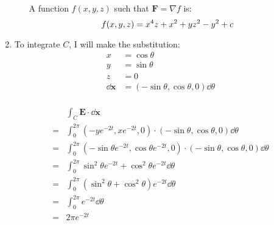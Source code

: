 \documentclass[10pt,\jkfside,a4paper]{article}
\begin{document}
\begin{enumerate}
\begin{enumerate}[label=(\roman*)]
A function $f(x, y, z)$ such that $\mathbf{F} = \nabla f$ is:
\begin{equation}
f(x, y, z) = x^4z + x^2 + yz^2 - y^2 + c \\
\end{equation}

\end{enumerate}

\item 

To integrate $C$, I will make the substitution:
\begin{equation}
\begin{split}
x &= \cos\theta \\
y &= \sin\theta \\
z &= 0 \\
\dd{\mathbf{x}} &= (-\sin\theta, \cos\theta, 0) \dd{\theta} \\
\end{split}
\end{equation}

\begin{equation}
\begin{split}
 & \int_C \mathbf{E} \cdot \dd{\mathbf{x}} \\
=& \int^{2\pi}_0 (-ye^{-2t}, xe^{-2t}, 0) \cdot (-\sin\theta, \cos\theta, 0) \dd{\theta} \\
=& \int^{2\pi}_0 (-\sin\theta e^{-2t}, \cos\theta e^{-2t}, 0) \cdot (-\sin\theta, \cos\theta, 0) \dd{\theta} \\
=& \int^{2\pi}_0 \sin^2\theta e^{-2t} + \cos^2\theta e^{-2t} \dd{\theta} \\
=& \int^{2\pi}_0 (\sin^2\theta + \cos^2\theta)e^{-2t} \dd{\theta} \\
=& \int^{2\pi}_0 e^{-2t} \dd{\theta} \\
=& 2\pi e^{-2t} \\
\end{split}
\end{equation}


\end{enumerate}
\end{document}
